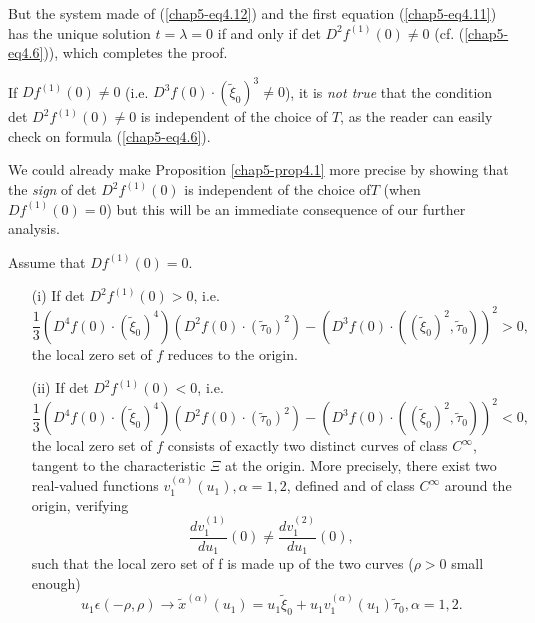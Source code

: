But the system made of (\ref{chap5-eq4.12}) and the first equation
(\ref{chap5-eq4.11}) has the unique solution $t = \lambda = 0$ if and
only if det $D^{2}f^{(1)} (0) \neq 0$ (cf. (\ref{chap5-eq4.6})), which
completes the proof.

\begin{remark}\label{chap5-rem4.1}
If $Df^{(1)} (0) \neq 0$ (i.e. $D^{3}f(0) \cdot
(\widetilde{\xi}_{0})^{3} \neq 0$), it is {\em not true} that the
condition det $D^{2}f^{(1)}(0) \neq 0$ is independent of the choice of
$T$, as the reader can easily check on formula (\ref{chap5-eq4.6}).
\end{remark}

\begin{remark}\label{chap5-rem4.2}
We could already make Proposition \ref{chap5-prop4.1} more precise by
showing that the {\em sign} of det $D^{2}f^{(1)}(0)$ is independent of
the choice of\pageoriginale $T$ (when $Df^{(1)} (0) = 0$) but this will
be an immediate consequence of our further analysis.
\end{remark}

\begin{theorem}\label{chap5-thm4.1}
Assume that $Df^{(1)} (0) = 0$.
\begin{enumerate}
\item[(i)] If det $D^{2}f^{(1)} (0) > 0$, i.e.
$$
\frac{1}{3} (D^{4}f(0) \cdot (\widetilde{\xi}_{0})^{4})(D^{2}f(0)
\cdot (\widetilde{\tau}_{0})^{2}) - (D^{3}f(0) \cdot
((\widetilde{\xi}_{0})^{2}, \widetilde{\tau}_{0}))^{2} > 0,
$$
the local zero set of $f$ reduces to the origin. 

\item[(ii)] If det $D^{2}f^{(1)}(0) < 0$, i.e. 
$$
\frac{1}{3} (D^{4}f(0) \cdot (\widetilde{\xi}_{0})^{4})(D^{2}f(0)
\cdot (\widetilde{\tau}_{0})^{2}) - (D^{3}f(0) \cdot
((\widetilde{\xi}_{0})^{2}, \widetilde{\tau}_{0}))^{2} < 0,
$$
the local zero set of $f$ consists of exactly two distinct curves of
class $C^{\infty}$, tangent to the characteristic $\Xi$ at the
origin. More precisely, there exist two real-valued functions
$v_{1}^{(\alpha)} (u_{1}), \alpha = 1, 2$, defined and of class
$C^{\infty}$ around the origin, verifying
\begin{equation*}
\frac{dv_{1}^{(1)}}{du_{1}} (0) \neq \frac{dv_{1}^{(2)}}{du_{1}}
(0),\tag{4.13}\label{chap5-eq4.13} 
\end{equation*}
such that the local zero set of f is made up of the two curves ($\rho
> 0$ small enough)
$$
u_{1} \epsilon (-\rho, \rho) \to \widetilde{x}^{(\alpha)}(u_{1}) =
u_{1}\widetilde{\xi}_{0} + u_{1}v_{1}^{(\alpha)}(u_{1})
\widetilde{\tau}_{0}, \alpha = 1, 2.
$$
\end{enumerate}
\end{theorem}

